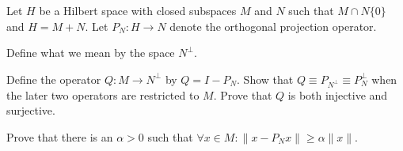 Let $H$ be a Hilbert space with closed subspaces $M$ and $N$ such that
$M\cap N\{0\}$ and $H=M+N$. Let $P_N:H\rightarrow N$ denote the
orthogonal projection operator. 
\begin{alist}
\item Define what we mean by the space $N^{\perp}$.
\item Define the operator $Q:M\rightarrow N^{\perp}$ by
$Q=I-P_N$. Show that $Q\equiv P_{N^{\perp}}\equiv P_N^{\perp}$ when
the later two operators are restricted to $M$.  Prove that $Q$ is both
injective and surjective.
\item Prove that there is an $\alpha>0$ such that $\forall x\in
M:\|x-P_Nx\|\geq \alpha\|x\|$.
\end{alist}
